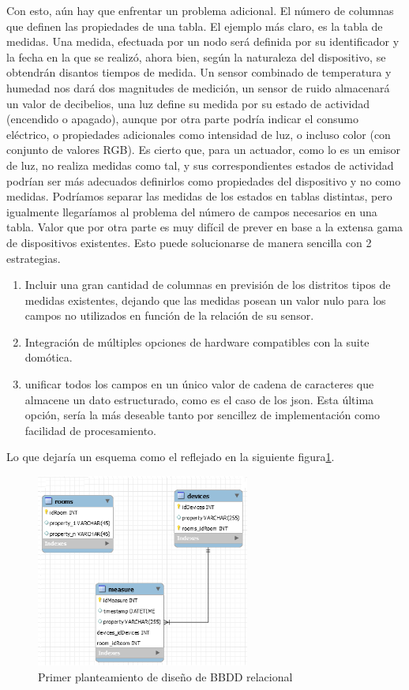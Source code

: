 Con esto, aún hay que enfrentar un problema adicional. El número de columnas que definen las propiedades de una tabla. El ejemplo más claro, es la tabla de medidas. Una medida, efectuada por un nodo será definida por su identificador y la fecha en la que se realizó, ahora bien, según la naturaleza del dispositivo, se obtendrán disantos tiempos de medida. Un sensor combinado de temperatura y humedad nos dará dos magnitudes de medición, un sensor de ruido almacenará un valor de decibelios, una luz define su medida por su estado de actividad (encendido o apagado), aunque por otra parte podría indicar el consumo eléctrico, o propiedades adicionales como intensidad de luz, o incluso color (con conjunto de valores RGB). Es cierto que, para un actuador, como lo es un emisor de luz, no realiza medidas como tal, y sus correspondientes estados de actividad podrían ser más adecuados definirlos como propiedades del dispositivo y no como medidas. Podríamos separar las medidas de los estados en tablas distintas, pero igualmente llegaríamos al problema del número de campos necesarios en una tabla. Valor que por otra parte es muy difícil de prever en base a la extensa gama de dispositivos existentes. Esto puede solucionarse de manera sencilla con 2 estrategias.

\begin{enumerate}
  \item Incluir una gran cantidad de columnas en previsión de los distritos tipos de medidas existentes, dejando que las medidas posean un valor nulo para los campos no utilizados en función de la relación de su sensor.

  \item Integración de múltiples opciones de hardware compatibles con la suite domótica.

  \item unificar todos los campos en un único valor de cadena de caracteres que almacene un dato estructurado, como es el caso de los \gls{json}. Esta última opción, sería la más deseable tanto por sencillez de implementación como facilidad de procesamiento.
\end{enumerate}

Lo que dejaría un esquema como el reflejado en la siguiente figura\ref{sqlschema3}.

\begin{figure}[hbt!]
\centering
\label{sqlschema3}
\includegraphics[height=2.5in]{figures/SQLSchemaExample_3.png}
\caption[Tercer planteamiento de diseño de BBDD relacional]{Primer planteamiento de diseño de BBDD relacional\footnotemark}
\end{figure}

